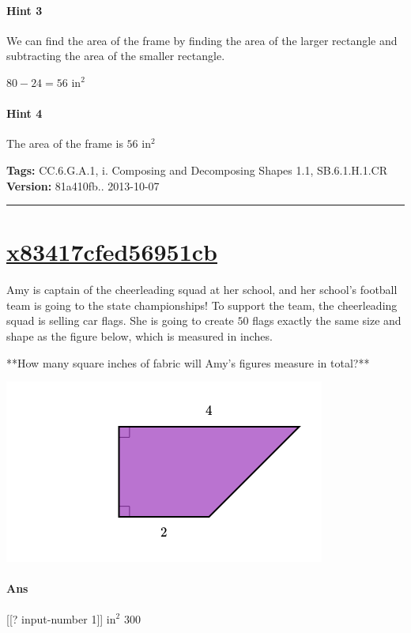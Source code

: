 \documentclass[twocolumn,10pt]{article}
\def\shrinkfactor{0.55}
\begin{document}
\paragraph{Hint 3}We can find the area of the frame by finding the area of the larger rectangle and subtracting the area of the smaller rectangle. 

$80-24=56\text{ in}^2$ 

\paragraph{Hint 4}The area of the frame is $56\text{ in}^2$ 



\medskip
\noindent
\textbf{Tags:} {\footnotesize CC.6.G.A.1, i.	Composing and Decomposing Shapes 1.1, SB.6.1.H.1.CR}\\
\textbf{Version:} 81a410fb.. 2013-10-07
\smallskip\hrule





\section{\href{https://www.khanacademy.org/devadmin/content/items/x83417cfed56951cb}{x83417cfed56951cb}}

\noindent
Amy is captain of the cheerleading squad at her school, and her school's football team is going to the state championships!  To support the team, the cheerleading squad is selling car flags.  She is going to create $50$ flags exactly the same size and shape as the figure below, which is measured in inches.  

**How many square inches of fabric will Amy's figures measure in total?**  


\includegraphics[scale=\shrinkfactor]{figures/05e73ba50508f13e74a3e721f9928d037170ce23.png}

\paragraph{Ans}  [[? input-number 1]] $\text{in}^2$  300
\end{document}
